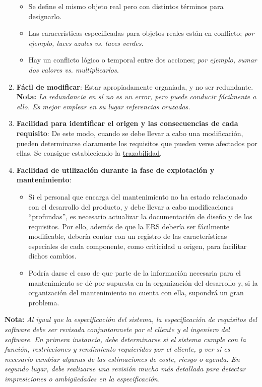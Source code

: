\begin{enumerate}
        \begin{itemize}
            \item Se define el mismo objeto real pero con distintos términos para designarlo.
            \item Las caracerísticas especificadas para objetos reales están en conflicto; \textit{por ejemplo, luces azules vs. luces verdes}.
            \item Hay un conflicto lógico o temporal entre dos acciones; \textit{por ejemplo, sumar dos valores vs. multiplicarlos.}
        \end{itemize}
    \item \textbf{Fácil de modificar}: Estar apropiadamente organiada, y no ser redundante.\\
    \textbf{Nota:} \textit{La redundancia en sí no es un error, pero puede conducir fácilmente a ello. Es mejor emplear en su lugar referencias cruzadas.}
    \item \textbf{Facilidad para identificar el origen y las consecuencias de cada requisito}: De este modo, cuando se debe llevar a cabo una modificación, pueden determinarse claramente los requisitos que pueden verse afectados por ellas. Se consigue estableciendo la \uline{trazabilidad}.
    \item \textbf{Facilidad de utilización durante la fase de explotación y mantenimiento}:
        \begin{itemize}
            \item Si el personal que encarga del mantenimiento no ha estado relacionado con el desarrollo del producto, y debe llevar a cabo modificaciones ``profundas'', es necesario actualizar la documentación de diseño y de los requisitos. Por ello, además de que la ERS debería ser fácilmente modificable, debería contar con un registro de las características especiales de cada componente, como criticidad u origen, para facilitar dichos cambios.
            \item Podría darse el caso de que parte de la información necesaria para el mantenimiento se dé por supuesta en la organización del desarrollo y, si la organización del mantenimiento no cuenta con ella, supondrá un gran problema.
        \end{itemize}
\end{enumerate}

\textbf{Nota:} \textit{Al igual que la especificación del sistema, la especificación de requisitos del software debe ser revisada conjuntamnete por el cliente y el ingeniero del software. En primera instancia, debe determinarse si el sistema cumple con la función, restricciones y rendimiento requieridos por el cliente, y ver si es necesario cambiar algunas de las estimaciones de coste, riesgo o agenda. En segundo lugar, debe realizarse una revisión mucho más detallada para detectar impresiciones o ambigüedades en la especificación.}



